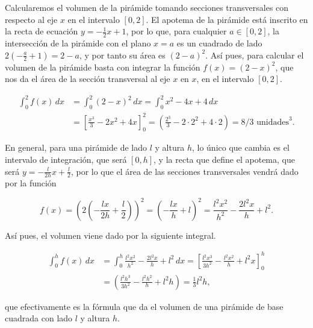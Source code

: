 \documentclass[
  spanish,
  a4paper,
]{scrreport}
\theoremstyle{definition}
\theoremstyle{remark}
\begin{document}
\begin{tcolorbox}[enhanced jigsaw, arc=.35mm, bottomrule=.15mm, bottomtitle=1mm, breakable, colback=white, colbacktitle=quarto-callout-tip-color!10!white, colframe=quarto-callout-tip-color-frame, coltitle=black, left=2mm, leftrule=.75mm, opacityback=0, opacitybacktitle=0.6, rightrule=.15mm, title=\textcolor{quarto-callout-tip-color}{\faLightbulb}\hspace{0.5em}{Solución}, titlerule=0mm, toprule=.15mm, toptitle=1mm]

Calcularemos el volumen de la pirámide tomando secciones transversales
con respecto al eje \(x\) en el intervalo \([0,2]\). El apotema de la
pirámide está inscrito en la recta de ecuación \(y=-\frac{1}{2}x+1\),
por lo que, para cualquier \(a\in[0,2]\), la intersección de la pirámide
con el plano \(x=a\) es un cuadrado de lado \(2(-\frac{a}{2}+1)=2-a\), y
por tanto su área es \((2-a)^2\). Así pues, para calcular el volumen de
la pirámide basta con integrar la función \(f(x)=(2-x)^2\), que nos da
el área de la sección transversal al eje \(x\) en \(x\), en el intervalo
\([0,2]\).

\begin{align*}
\int_0^2 f(x)\,dx 
&= \int_0^2 (2-x)^2\,dx 
= \int_0^2 x^2-4x+4\,dx \\
&= \left[\frac{x^3}{3}-2x^2+4x\right]_0^2
= \left(\frac{2^3}{3}-2\cdot 2^2+4\cdot 2\right)
= 8/3 \mbox{ unidades}^3.
\end{align*}

En general, para una pirámide de lado \(l\) y altura \(h\), lo único que
cambia es el intervalo de integración, que será \([0,h]\), y la recta
que define el apotema, que será \(y=-\frac{l}{2h}x+\frac{l}{2}\), por lo
que el área de las secciones transversales vendrá dado por la función

\[
f(x)=\left(2\left(-\frac{lx}{2h}+\frac{l}{2}\right)\right)^2 
= \left(-\frac{lx}{h}+l\right)^2
=\frac{l^2x^2}{h^2}-\frac{2l^2x}{h}+l^2.
\]

Así pues, el volumen viene dado por la siguiente integral.

\begin{align*}
\int_0^h f(x)\,dx
&= \int_0^h \frac{l^2x^2}{h^2}-\frac{2l^2x}{h}+l^2\,dx 
= \left[\frac{l^2x^3}{3h^2}-\frac{l^2x^2}{h}+l^2x\right]_0^h \\
&= \left(\frac{l^2h^3}{3h^2}-\frac{l^2h^2}{h}+l^2h\right) 
= \frac{1}{3}l^2h,
\end{align*}

que efectivamente es la fórmula que da el volumen de una pirámide de
base cuadrada con lado \(l\) y altura \(h\).

\end{tcolorbox}
\end{document}
